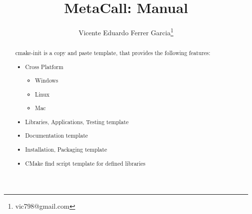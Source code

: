 \documentclass{article}
\begin{document}
\title{MetaCall: Manual}

\author{Vicente Eduardo Ferrer Garcia\thanks{vic798@gmail.com}}

\maketitle

\begin{abstract}
\noindent
cmake-init is a copy and paste template, that provides the following features:

\begin{itemize}
	\item Cross Platform
	\begin{itemize}
		\item Windows
		\item Linux
		\item Mac
	\end{itemize}
	\item Libraries, Applications, Testing template
	\item Documentation template
	\item Installation, Packaging template
	\item CMake find script template for defined libraries
\end{itemize}

\end{abstract}

\setcounter{tocdepth}{2}
\tableofcontents

\newpage
\end{document}
